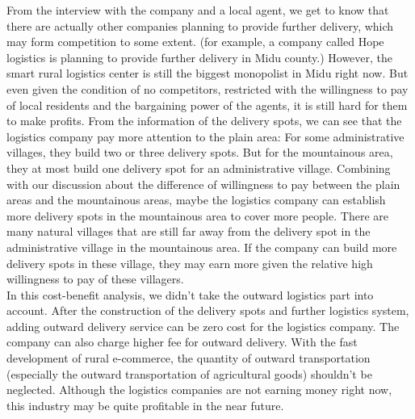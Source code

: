 \documentclass{article}
\begin{document}
From the interview with the company and a local agent, we get to know that there are actually other companies planning to provide further delivery, which may form competition to some extent. (for example, a company called Hope logistics is planning to provide further delivery in Midu county.) However, the smart rural logistics center is still the biggest monopolist in Midu right now. But even given the condition of no competitors, restricted with the willingness to pay of local residents and the bargaining power of the agents, it is still hard for them to make profits. From the information of the delivery spots, we can see that the logistics company pay more attention to the plain area: For some administrative villages, they build two or three delivery spots. But for the mountainous area, they at most build one delivery spot for an administrative village. Combining with our discussion about the difference of willingness to pay between the plain areas and the mountainous areas, maybe the logistics company can establish more delivery spots in the mountainous area to cover more people. There are many natural villages that are still far away from the delivery spot in the administrative village in the mountainous area. If the company can build more delivery spots in these village, they may earn more given the relative high willingness to pay of these villagers.\\
\mbox{\hspace{2em}}
In this cost-benefit analysis, we didn’t take the outward logistics part into account. After the construction of the delivery spots and further logistics system, adding outward delivery service can be zero cost for the logistics company. The company can also charge higher fee for outward delivery. With the fast development of rural e-commerce, the quantity of outward transportation (especially the outward transportation of agricultural goods) shouldn’t be neglected. Although the logistics companies are not earning money right now, this industry may be quite profitable in the near future.\\
\end{document}
